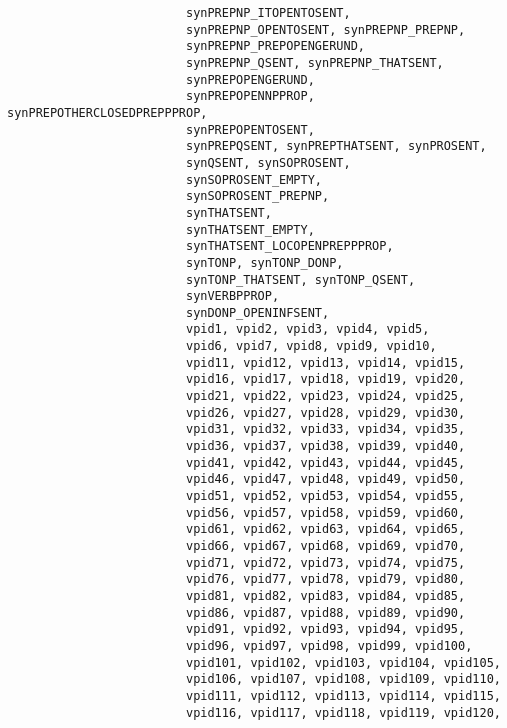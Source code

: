 \begin{verbatim}
                         synPREPNP_ITOPENTOSENT,         
                         synPREPNP_OPENTOSENT, synPREPNP_PREPNP, 
                         synPREPNP_PREPOPENGERUND,       
                         synPREPNP_QSENT, synPREPNP_THATSENT, 
                         synPREPOPENGERUND,              
                         synPREPOPENNPPROP, synPREPOTHERCLOSEDPREPPPROP,
                         synPREPOPENTOSENT,              
                         synPREPQSENT, synPREPTHATSENT, synPROSENT, 
                         synQSENT, synSOPROSENT, 
                         synSOPROSENT_EMPTY,             
                         synSOPROSENT_PREPNP,            
                         synTHATSENT, 
                         synTHATSENT_EMPTY,              
                         synTHATSENT_LOCOPENPREPPPROP,   
                         synTONP, synTONP_DONP,          
                         synTONP_THATSENT, synTONP_QSENT,
                         synVERBPPROP,                   
                         synDONP_OPENINFSENT,
                         vpid1, vpid2, vpid3, vpid4, vpid5,
                         vpid6, vpid7, vpid8, vpid9, vpid10,
                         vpid11, vpid12, vpid13, vpid14, vpid15,
                         vpid16, vpid17, vpid18, vpid19, vpid20,
                         vpid21, vpid22, vpid23, vpid24, vpid25,
                         vpid26, vpid27, vpid28, vpid29, vpid30,
                         vpid31, vpid32, vpid33, vpid34, vpid35,
                         vpid36, vpid37, vpid38, vpid39, vpid40,
                         vpid41, vpid42, vpid43, vpid44, vpid45,
                         vpid46, vpid47, vpid48, vpid49, vpid50,
                         vpid51, vpid52, vpid53, vpid54, vpid55,
                         vpid56, vpid57, vpid58, vpid59, vpid60,
                         vpid61, vpid62, vpid63, vpid64, vpid65,
                         vpid66, vpid67, vpid68, vpid69, vpid70,
                         vpid71, vpid72, vpid73, vpid74, vpid75,
                         vpid76, vpid77, vpid78, vpid79, vpid80,
                         vpid81, vpid82, vpid83, vpid84, vpid85,
                         vpid86, vpid87, vpid88, vpid89, vpid90,
                         vpid91, vpid92, vpid93, vpid94, vpid95,
                         vpid96, vpid97, vpid98, vpid99, vpid100,
                         vpid101, vpid102, vpid103, vpid104, vpid105,
                         vpid106, vpid107, vpid108, vpid109, vpid110,
                         vpid111, vpid112, vpid113, vpid114, vpid115,
                         vpid116, vpid117, vpid118, vpid119, vpid120,

\end{verbatim}
